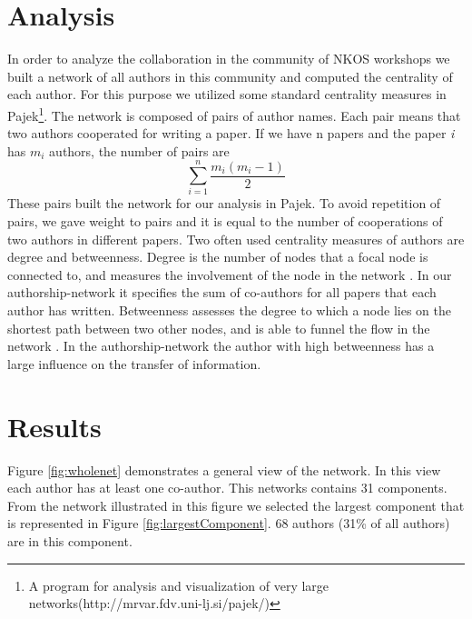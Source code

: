 \documentclass[runningheads,a4paper]{llncs}
\begin{document}


\section{Analysis}\label{analysis}

In order to analyze the collaboration in the community of NKOS workshops we built a network of all authors in this community and computed the centrality of each author. For this purpose we utilized some standard centrality measures in Pajek\footnote{A program for analysis and visualization of very large networks(http://mrvar.fdv.uni-lj.si/pajek/)}. The network is composed of pairs of author names. Each pair means that two authors cooperated for writing a paper. If we have n papers and the paper \textit{i} has $m_i$ authors, the number of pairs are 
\begin{equation}\sum\limits_{i=1}^n \frac{m_i(m_i-1)}{2}\end{equation}
These pairs built the network for our analysis in Pajek. To avoid repetition of pairs, we gave weight to pairs and it is equal to the number of cooperations of two authors in different papers. 
Two often used centrality measures of authors are degree and betweenness. Degree is the number of nodes that a focal node is connected to, and measures the involvement of the node in the network \cite{Opsahl2010}. In our authorship-network it specifies the sum of co-authors for all papers that each author has written. Betweenness assesses the degree to which a node lies on the shortest path between two other nodes, and is able to funnel the flow in the network \cite{Opsahl2010}. In the authorship-network the author with high betweenness has a large influence on the transfer of information. 


\section{Results}\label{results}

Figure \ref{fig:wholenet} demonstrates a general view of the network. In this view each author has at least one co-author. This networks contains 31 components. From the network illustrated in this figure we selected the largest component that is represented in Figure \ref{fig:largestComponent}. 68 authors (31\% of all authors) are in this component.
\end{document}
